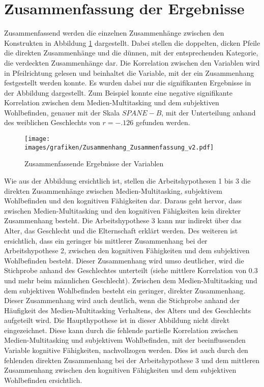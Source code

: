 \section{Zusammenfassung der Ergebnisse}\label{label.ergebnisse.zusammenfassung}
Zusammenfassend werden die einzelnen Zusammenhänge zwischen den Konstrukten in Abbildung \ref{pic.ergebniss.zusammenfassung} dargestellt. Dabei stellen die doppelten, dicken Pfeile die direkten Zusammenhänge und die dünnen, mit der entsprechenden Kategorie, die verdeckten Zusammenhänge dar. Die Korrelation zwischen den Variablen wird in Pfeilrichtung gelesen und beinhaltet die Variable, mit der ein Zusammenhang festgestellt werden konnte. Es wurden dabei nur die signifikanten Ergebnisse in der Abbildung dargestellt. Zum Beispiel konnte eine negative signifikante Korrelation zwischen dem Medien-Multitasking und dem subjektiven Wohlbefinden, genauer mit der Skala $SPANE-B$, mit der Unterteilung anhand des weiblichen Geschlechts von $r=-.126$ gefunden werden.
\begin{figure}[ht]
    \centering
    \texttt{[image: images/grafiken/Zusammenhang\_Zusammenfassung\_v2.pdf]}
     \caption{Zusammenfassende Ergebnisse der Variablen}
     \label{pic.ergebniss.zusammenfassung}
\end{figure}
Wie aus der Abbildung ersichtlich ist, stellen die Arbeitshypothesen 1 bis 3 die direkten Zusammenhänge zwischen Medien-Multitasking, subjektivem Wohlbefinden und den kognitiven Fähigkeiten dar. Daraus geht hervor, dass zwischen Medien-Multitasking und den kognitiven Fähigkeiten kein direkter Zusammenhang besteht. Die Arbeitshypothese 3 kann nur indirekt über das Alter, das Geschlecht und die Elternschaft erklärt werden. Des weiteren ist ersichtlich, dass ein geringer bis mittlerer Zusammenhang bei der Arbeitshypothese 2, zwischen den kognitiven Fähigkeiten und dem subjektiven Wohlbefinden besteht. Dieser Zusammenhang wird umso deutlicher, wird die Stichprobe anhand des Geschlechtes unterteilt (siehe mittlere Korrelation von 0.3 und mehr beim männlichen Geschlecht). Zwischen dem Medien-Multitasking und dem subjektiven Wohlbefinden besteht ein geringer, direkter Zusammenhang. Dieser Zusammenhang wird auch deutlich, wenn die Stichprobe anhand der Häufigkeit des Medien-Multitasking Verhaltens, des Alters und des Geschlechts aufgeteilt wird. Die Haupthypothese ist in dieser Abbildung nicht direkt eingezeichnet. Diese kann durch die fehlende partielle Korrelation zwischen Medien-Multitasking und subjektivem Wohlbefinden, mit der beeinflussenden Variable kognitive Fähigkeiten, nachvollzogen werden. Dies ist auch durch den fehlenden direkten Zusammenhang bei der Arbeitshypothese 3 und dem mittleren Zusammenhang zwischen den kognitiven Fähigkeiten und dem subjektiven Wohlbefinden ersichtlich.  




